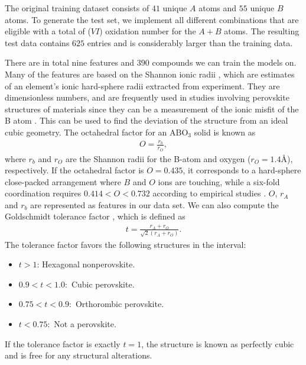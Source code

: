 The original training dataset consists of $41$ unique $A$ atoms and $55$ unique $B$ atoms. To generate the test set, we implement all different combinations that are eligible with a total of ($VI$) oxidation number for the $A+B$ atoms. The resulting test data contains $625$ entries and is considerably larger than the training data.


There are in total nine features and $390$ compounds we can train the models on. Many of the features are based on the Shannon ionic radii \cite{Shannon1976}, which are estimates of an element's ionic hard-sphere radii extracted from experiment. They are dimensionless numbers, and are frequently used in studies involving perovskite structures of materials since they can be a measurement of the ionic misfit of the B atom \cite{Shannon1976}. This can be used to find the deviation of the structure from an ideal cubic geometry. The octahedral factor for an ABO$_3$ solid is known as
\begin{align}
  O = \frac{r_b}{r_O},
\end{align}
where $r_b$ and $r_O$ are the Shannon radii for the B-atom and oxygen ($r_O = 1.4\text{\AA}$), respectively. If the octahedral factor is $O=0.435$, it corresponds to a hard-sphere close-packed arrangement where $B$ and $O$ ions are touching, while a six-fold coordination requires $0.414 < O < 0.732$ according to empirical studies \cite{Zhang2007}. $O$, $r_A$ and $r_b$ are represented as features in our data set. We can also compute the Goldschmidt tolerance factor \cite{Goldschmidt1926}, which is defined as
\begin{align}
  t = \frac{r_A + r_O}{\sqrt{2}(r_A+r_O)}.
\end{align}
\noindent The tolerance factor favors the following structures in the interval:
\begin{itemize}
  \item $t>1$: Hexagonal nonperovskite.
  \item $0.9 < t < 1.0:$ Cubic perovskite.
  \item $0.75 < t < 0.9:$ Orthorombic perovskite.
  \item $t < 0.75:$ Not a perovskite.
\end{itemize}
\noindent If the tolerance factor is exactly $t=1$, the structure is known as perfectly cubic and is free for any structural alterations.

